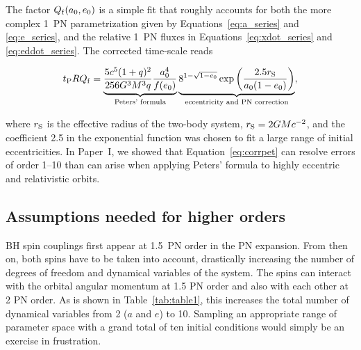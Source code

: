 \documentclass[usenatbib]{mnras}
\begin{document}
The factor $Q_{\rm f}(a_0,e_0)$ is a simple fit that roughly accounts for both the more complex 1~PN parametrization given by Equations~\eqref{eq:a_series} and \eqref{eq:e_series}, and the relative 1~PN fluxes in Equations~\eqref{eq:xdot_series} and \eqref{eq:eddot_series}.
The corrected time-scale reads

\begin{align}
     t_{\rm P}RQ_{\rm f} = \label{eq:corrpet} 
     \underbrace{ \frac{5c^5(1 + q)^2}{256 G^3 M^3q} \frac{a_0^4}{f(e_0)} }_{\text{Peters' formula}}
    \underbrace{ 8^{ 1- \sqrt{1-e_0}} \exp \left( \frac{2.5 r_{\rm S}}{a_0(1-e_0)} \right)}_{\text{eccentricity and PN correction}},
\end{align}

\noindent where $r_{\rm S}$ is the effective \citet{Schwarzschild_1916} radius of the two-body system, $r_{\rm S} = 2GMc^{-2}$, and the coefficient 2.5 in the exponential function was chosen to fit a large range of initial eccentricities. In Paper~I, we showed that Equation~\eqref{eq:corrpet} can resolve errors of order 1--10 than can arise when applying Peters' formula to highly eccentric and relativistic orbits.

\subsection{Assumptions needed for higher orders}

BH spin couplings first appear at 1.5~PN order in the PN expansion. From then on, both spins have to be taken into account, drastically increasing the number of degrees of freedom and dynamical variables of the system. The spins can interact with the orbital angular momentum at 1.5 PN order and also with each other at 2 PN order. As is shown in Table~\ref{tab:table1}, this increases the total number of dynamical variables from 2 ($a$ and $e$) to 10. Sampling an appropriate range of parameter space with a grand total of ten initial conditions would simply be an exercise in frustration.
\end{document}
